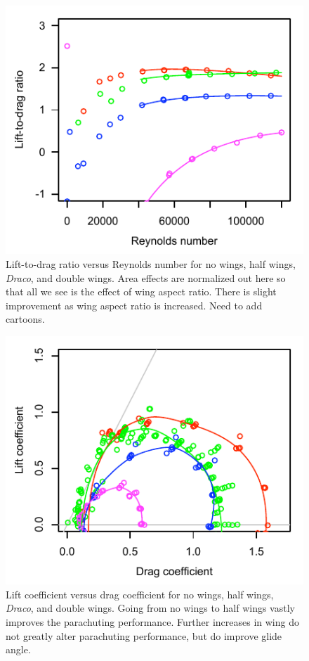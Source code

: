\documentclass[10pt]{article}
\newcommand{\Draco}{\emph{Draco}}
\begin{document}
\begin{figure}
\includegraphics{figures/LD_v_Re.pdf}
\caption{Lift-to-drag ratio versus Reynolds number for no wings, half wings, \Draco, and double wings.  Area effects are normalized out here so that all we see is the effect of wing aspect ratio.  There is slight improvement as wing aspect ratio is increased.  Need to add cartoons.}
\label{fig:LD_v_Re}
\end{figure}

\begin{figure}
\includegraphics{figures/Cl_v_Cd_wings.pdf}
\caption{Lift coefficient versus drag coefficient for no wings, half wings, \Draco, and double wings.  Going from no wings to half wings vastly improves the parachuting performance.  Further increases in wing do not greatly alter parachuting performance, but do improve glide angle. }
\label{fig:Cl_v_Cd_wings}
\end{figure}
\end{document}
